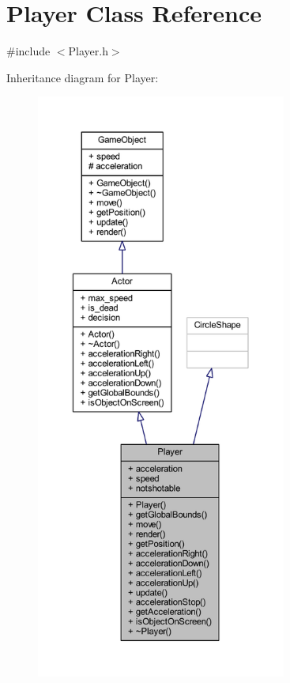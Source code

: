 \hypertarget{class_player}{}\section{Player Class Reference}
\label{class_player}


{\ttfamily \#include $<$Player.\+h$>$}



Inheritance diagram for Player\+:
\nopagebreak
\begin{figure}[H]
\begin{center}
\leavevmode
\includegraphics[height=550pt]{class_player__inherit__graph}
\end{center}
\end{figure}



